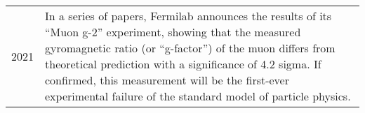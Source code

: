 \documentclass[../main.tex]{subfiles}
\begin{document}
\begin{center}
\begin{longtable}{p{}  p{}}
2021&In a series of papers, Fermilab announces the results of its “Muon g-2” experiment, showing that the measured gyromagnetic ratio (or “g-factor”) of the muon differs from theoretical prediction with a significance of 4.2 sigma. If confirmed, this measurement will be the first-ever experimental failure of the standard model of particle physics.
    \end{longtable}
\end{center}
\end{document}
